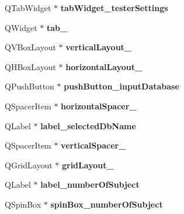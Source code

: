 \begin{DoxyCompactItemize}
Q\+Tab\+Widget $\ast$ {\bfseries tab\+Widget\+\_\+tester\+Settings}
\item 
\mbox{\label{class_ui___main_window_a41c7e77dd12b9445e13dbe8fb5ae1488}} 
Q\+Widget $\ast$ {\bfseries tab\+\_}
\item 
\mbox{\label{class_ui___main_window_a2f68687109246969cb0a389b999574aa}} 
Q\+V\+Box\+Layout $\ast$ {\bfseries vertical\+Layout\+\_}
\item 
\mbox{\label{class_ui___main_window_aa53955f35b7d9f3d161525ed8639db84}} 
Q\+H\+Box\+Layout $\ast$ {\bfseries horizontal\+Layout\+\_}
\item 
\mbox{\label{class_ui___main_window_a83192f777e5708b84cef52aa2da731eb}} 
Q\+Push\+Button $\ast$ {\bfseries push\+Button\+\_\+input\+Database}
\item 
\mbox{\label{class_ui___main_window_a100e0ffd031f76754eba5078288deabf}} 
Q\+Spacer\+Item $\ast$ {\bfseries horizontal\+Spacer\+\_}
\item 
\mbox{\label{class_ui___main_window_adab474b60ccf6e8583088c9d07b0fe93}} 
Q\+Label $\ast$ {\bfseries label\+\_\+selected\+Db\+Name}
\item 
\mbox{\label{class_ui___main_window_a9d4bfb2fa0d87ccf9f7a311116676be6}} 
Q\+Spacer\+Item $\ast$ {\bfseries vertical\+Spacer\+\_}
\item 
\mbox{\label{class_ui___main_window_a8ee86315639f324b17708efc7dbe8b19}} 
Q\+Grid\+Layout $\ast$ {\bfseries grid\+Layout\+\_}
\item 
\mbox{\label{class_ui___main_window_acd088b13af1e01909254cb8acd7b3f12}} 
Q\+Label $\ast$ {\bfseries label\+\_\+number\+Of\+Subject}
\item 
\mbox{\label{class_ui___main_window_aaff64e8064d03bb02856f99b597d40fc}} 
Q\+Spin\+Box $\ast$ {\bfseries spin\+Box\+\_\+number\+Of\+Subject}
\item 

\end{DoxyCompactItemize}
